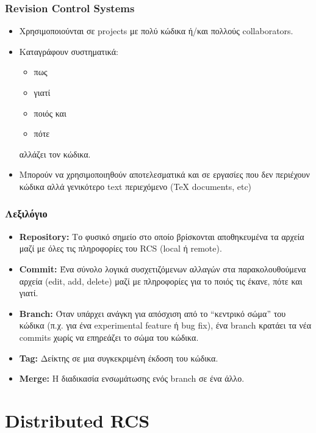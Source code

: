 \documentclass[]{beamer}
\begin{document}
\begin{frame}
  \frametitle{Revision Control Systems}
  \begin{itemize}
    \item Χρησιμοποιούνται σε projects με πολύ κώδικα ή/και πολλούς
      collaborators.
    \item Καταγράφουν συστηματικά:
      \begin{itemize}
        \item πως
        \item γιατί
        \item ποιός και
        \item πότε
      \end{itemize}
      αλλάζει τον κώδικα.
    \item Μπορούν να χρησιμοποιηθούν αποτελεσματικά και σε εργασίες που δεν
      περιέχουν κώδικα αλλά γενικότερο text περιεχόμενο (\TeX{} documents,
      etc)
  \end{itemize}
\end{frame}

\begin{frame}
  \frametitle{Λεξιλόγιο}
  \begin{itemize}
  \item \textbf{Repository:} Το φυσικό σημείο στο οποίο βρίσκονται αποθηκευμένα
    τα αρχεία μαζί με όλες τις πληροφορίες του RCS (local ή remote).
  \item \textbf{Commit:} Ένα σύνολο λογικά συσχετιζόμενων αλλαγών στα
    παρακολουθούμενα αρχεία (edit, add, delete) μαζί με πληροφορίες για το ποιός
    τις έκανε, πότε και γιατί.
  \item \textbf{Branch:} Όταν υπάρχει ανάγκη για απόσχιση από το ``κεντρικό
    σώμα'' του κώδικα (π.χ. για ένα experimental feature ή bug fix), ένα branch
    κρατάει τα νέα commits χωρίς να επηρεάζει το σώμα του κώδικα.
  \item \textbf{Tag:} Δείκτης σε μια συγκεκριμένη έκδοση του κώδικα.
  \item \textbf{Merge:} Η διαδικασία ενσωμάτωσης ενός branch σε ένα άλλο.
  \end{itemize}
\end{frame}

\section{Distributed RCS}
\end{document}
